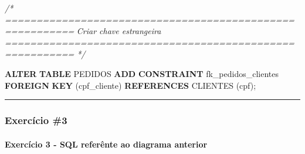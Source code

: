 \documentclass[
]{book}
\newenvironment{Shaded}{\begin{snugshade}}{\end{snugshade}}
\newcommand{\CommentTok}[1]{\textcolor[rgb]{0.56,0.35,0.01}{\textit{#1}}}
\newcommand{\KeywordTok}[1]{\textcolor[rgb]{0.13,0.29,0.53}{\textbf{#1}}}
\newcommand{\NormalTok}[1]{#1}
\begin{document}
\begin{Shaded}
\begin{Highlighting}[]
\CommentTok{/* =========================================================}
\CommentTok{   Criar chave estrangeira}
\CommentTok{   ========================================================= */}

\KeywordTok{ALTER} \KeywordTok{TABLE}\NormalTok{ PEDIDOS }\KeywordTok{ADD} \KeywordTok{CONSTRAINT}\NormalTok{ fk\_pedidos\_clientes  }\KeywordTok{FOREIGN} \KeywordTok{KEY}\NormalTok{ (cpf\_cliente) }\KeywordTok{REFERENCES}\NormalTok{ CLIENTES (cpf);}

\end{Highlighting}
\end{Shaded}

\begin{center}\rule{0.5\linewidth}{0.5pt}\end{center}

\subsubsection{Exercício \#3}\label{exercuxedcio-3}



\paragraph{Exercício 3 - SQL referênte ao diagrama anterior}\label{exercuxedcio-3---sql-referuxeante-ao-diagrama-anterior}
\end{document}
